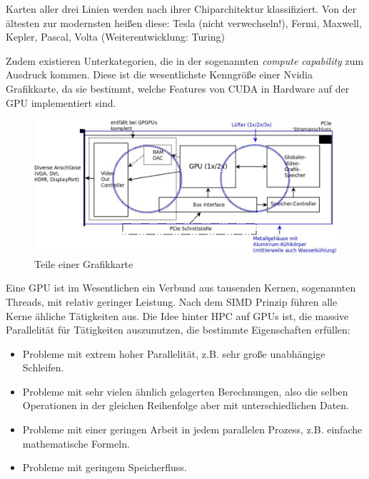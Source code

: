        Karten aller drei Linien werden nach ihrer Chiparchitektur klassifiziert. Von der ältesten zur modernsten heißen diese: Tesla (nicht verwechseln!), Fermi, Maxwell, Kepler, Pascal, Volta (Weiterentwicklung: Turing)
        
        Zudem existieren Unterkategorien, die in der sogenannten \textit{\gls{compute capability}} zum Ausdruck kommen. Diese ist die wesentlichste Kenngröße einer Nvidia Grafikkarte, da sie bestimmt, welche Features von CUDA in Hardware auf der GPU implementiert sind.		
		
        \begin{figure}[h]
			\centering
    		\includegraphics[width=\textwidth]{chapter2/pictures/gpu.jpg}
    		\caption[Grafikkarte]{Teile einer Grafikkarte}
    		\label{2:graka}
		\end{figure}
		
		Eine GPU ist im Wesentlichen ein Verbund aus tausenden Kernen, sogenannten \Glspl{Thread}, mit relativ geringer Leistung. Nach dem SIMD Prinzip führen alle Kerne ähliche Tätigkeiten aus. Die Idee hinter HPC auf GPUs ist, die massive Parallelität für Tätigkeiten auszunutzen, die bestimmte Eigenschaften erfüllen:
		\begin{itemize}
			\item Probleme mit extrem hoher Parallelität, z.B. sehr große unabhängige Schleifen.
			\item Probleme mit sehr vielen ähnlich gelagerten Berechnungen, also die selben Operationen in der gleichen Reihenfolge aber mit unterschiedlichen Daten.
			\item Probleme mit einer geringen \Gls{Arbeit} in jedem parallelen Prozess, z.B. einfache mathematische Formeln.
			\item Probleme mit geringem Speicherfluss.			
		\end{itemize}
			
